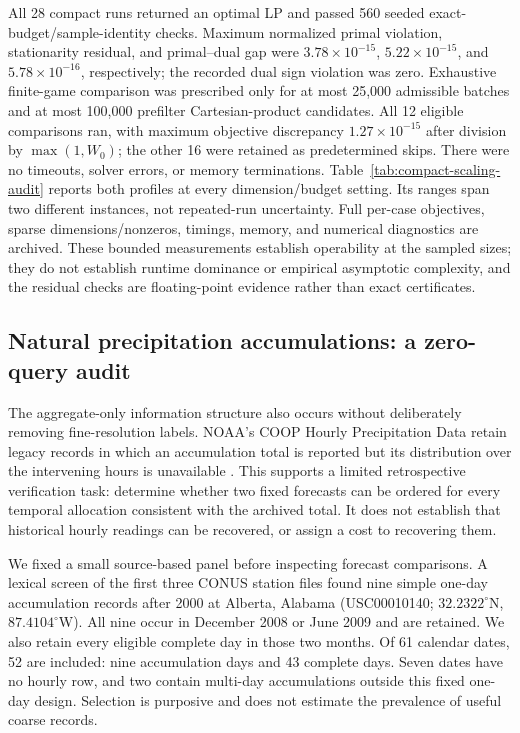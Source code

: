 \documentclass[12pt]{article}
\begin{document}
All 28 compact runs returned an optimal LP and passed 560 seeded exact-budget/sample-identity checks. Maximum normalized primal violation, stationarity residual, and primal--dual gap were $3.78\times10^{-15}$, $5.22\times10^{-15}$, and $5.78\times10^{-16}$, respectively; the recorded dual sign violation was zero. Exhaustive finite-game comparison was prescribed only for at most 25,000 admissible batches and at most 100,000 prefilter Cartesian-product candidates. All 12 eligible comparisons ran, with maximum objective discrepancy $1.27\times10^{-15}$ after division by $\max(1,W_0)$; the other 16 were retained as predetermined skips. There were no timeouts, solver errors, or memory terminations.
Table~\ref{tab:compact-scaling-audit} reports both profiles at every dimension/budget setting. Its ranges span two different instances, not repeated-run uncertainty. Full per-case objectives, sparse dimensions/nonzeros, timings, memory, and numerical diagnostics are archived. These bounded measurements establish operability at the sampled sizes; they do not establish runtime dominance or empirical asymptotic complexity, and the residual checks are floating-point evidence rather than exact certificates.


\subsection{Natural precipitation accumulations: a zero-query audit}
\label{sec:noaa-natural}
The aggregate-only information structure also occurs without deliberately
removing fine-resolution labels. NOAA's COOP Hourly Precipitation Data retain
legacy records in which an accumulation total is reported but its distribution
over the intervening hours is unavailable \cite{noaa_hpd_v2,noaa_hpd_format}.
This supports a limited retrospective verification task: determine whether two
fixed forecasts can be ordered for every temporal allocation consistent with
the archived total. It does not establish that historical hourly readings can
be recovered, or assign a cost to recovering them.

We fixed a small source-based panel before inspecting forecast comparisons.
A lexical screen of the first three CONUS station files found nine simple
one-day accumulation records after 2000 at Alberta, Alabama
(USC00010140; $32.2322^{\circ}$N, $87.4104^{\circ}$W). All nine occur in December
2008 or June 2009 and are retained. We also retain every eligible complete day
in those two months. Of 61 calendar dates, 52 are included: nine accumulation
days and 43 complete days. Seven dates have no hourly row, and two contain
multi-day accumulations outside this fixed one-day design. Selection is
purposive and does not estimate the prevalence of useful coarse records.
\end{document}
